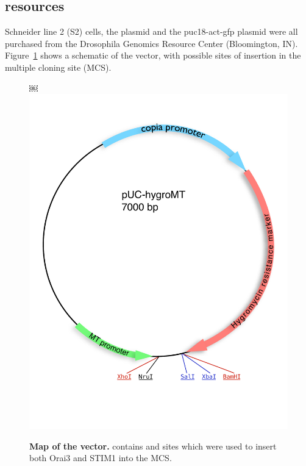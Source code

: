 \subsection{\droso{} resources}
\droso{} Schneider line 2 (S2) cells, the \puchygmt{} plasmid and the  {puc18-act-gfp} plasmid were all purchased from the Drosophila Genomics Resource Center (Bloomington, IN). Figure~\ref{fig:puchyg_map} shows a schematic of the \puchygmt{} vector, with possible sites of insertion in the multiple cloning site (MCS). 



\begin{figure}[!h]
\begin{center}
	￼\includegraphics[scale=0.58]{Figures/puchygromt.pdf}\vspace{-45pt}

	\caption[Map of the puc-HygroMT vector]{{\bfseries Map of the \puchygmt{} vector.} \puchygmt{} contains \sali{} and \xbai{} sites which were used to insert both Orai3 and STIM1 into the MCS.}
	\label{fig:puchyg_map}

\end{center}
\end{figure}

